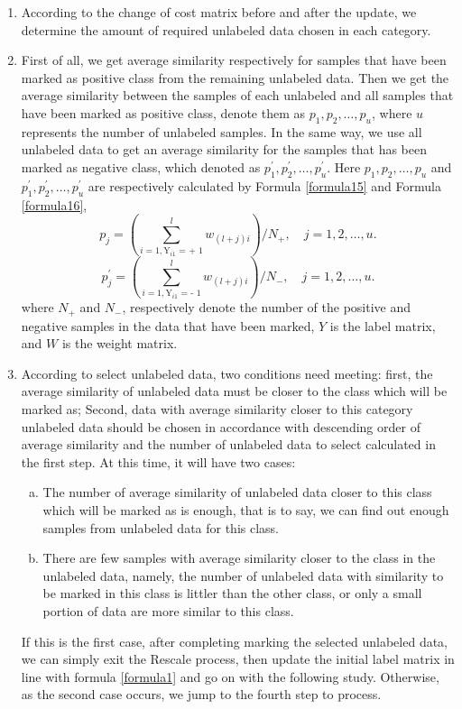 \documentclass{svjour3}                     %
\begin{document}
\begin{enumerate}[1)]
  \item According to the change of cost matrix before and after the update, we determine the amount of required unlabeled data chosen in each category.
  \item First of all, we get average similarity respectively for samples that have been marked as positive class from the remaining unlabeled data. Then we get the average similarity between the samples of each unlabeled and all samples that have been marked as positive class, denote them as ${p_1},{p_2},\ldots ,{p_u}$, where $u$ represents the number of unlabeled samples. In the same way,  we use all unlabeled data to get an average similarity for the samples that has been marked as negative class, which denoted as $p_1^\prime ,p_2^\prime , \ldots ,p_u^\prime $. Here ${p_1},{p_2},\ldots ,{p_u}$ and $p_1^\prime ,p_2^\prime , \ldots ,p_u^\prime $ are respectively calculated by Formula \ref{formula15} and Formula \ref{formula16},
  \begin{equation} \label{formula15}
    {p_j} = (\mathop \sum \limits_{i = 1,{{\text{Y}}_{i1}}{\text{ =   + }}1}^l {w_{\left( {l + j} \right)i}})/{N_ + },\quad j = 1,2,\ldots,u.
  \end{equation}
  \begin{equation} \label{formula16}
  p_j^\prime  = (\mathop \sum \limits_{i = 1,{{\text{Y}}_{i1}}{\text{ =   - }}1}^l {w_{\left( {l + j} \right)i}})/{N_ - },\quad j = 1,2,\ldots,u.
  \end{equation}
  where $N_+$ and $N_-$, respectively denote the number of the positive and negative samples in the data that have been marked, $Y$ is the label matrix, and $W$ is the weight matrix.
  \item According to select unlabeled data, two conditions need meeting: first, the average similarity
of unlabeled data must be closer to the class which will be marked as; Second, data with average similarity closer to this category unlabeled data should be chosen in accordance with descending order of average similarity and the number of unlabeled data to select calculated in the first step. At this time, it will have two cases:
\begin{enumerate}[a)]
 \item The number of average similarity of unlabeled data closer to this class which will be marked as is enough, that is to say, we can find out enough samples from unlabeled data for this class.
 \item There are few samples with average similarity closer to the class in the unlabeled data, namely, the number of unlabeled data with similarity to be marked in this class is  littler than the other class, or only a small portion of data are more similar to this class.
\end{enumerate}
If this is the first case, after completing marking the selected unlabeled data, we can simply exit the Rescale process, then update the initial label matrix in line with formula \ref{formula1} and go on with the following study. Otherwise, as the second case occurs, we jump to the fourth step to process. \label{step3}


\end{enumerate}
\end{document}
